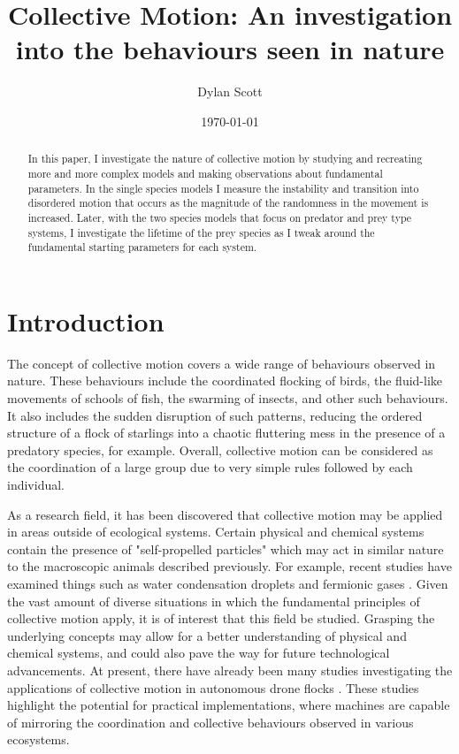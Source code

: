 \documentclass[%
11pt,
amsmath, amssymb,
aps,
pra
]{revtex4-2}
\begin{document}
\title{Collective Motion: An investigation into the behaviours seen in nature}
\author{Dylan Scott}
\date{\today}


\begin{abstract}
In this paper, I investigate the nature of collective motion by studying and recreating more and more complex models
and making observations about fundamental parameters. In the single species models I measure the instability and transition
into disordered motion that occurs as the magnitude of the randomness in the movement is increased. Later, with the two species
models that focus on predator and prey type systems, I investigate the lifetime of the prey species as I tweak around the fundamental
starting parameters for each system. 
\end{abstract}

\maketitle


\tableofcontents
\section{Introduction}
The concept of collective motion covers a wide range of behaviours observed in nature. 
These behaviours include the coordinated flocking of birds, the fluid-like movements of schools of fish, 
the swarming of insects, and other such behaviours. It also includes the sudden disruption of such patterns, reducing
the ordered structure of a flock of starlings into a chaotic fluttering mess in the presence of a predatory species, for example.
Overall, collective motion can be considered as the coordination of a large group due to very simple rules followed
by each individual. 

As a research field, it has been discovered that collective motion may be applied in areas outside of 
ecological systems. Certain physical and chemical systems contain the presence of "self-propelled particles" which may
act in similar nature to the macroscopic animals described previously. For example, recent studies have examined 
things such as water condensation droplets \cite{lin2023emergent} and fermionic gases \cite{wang2023viscous}.
Given the vast amount of diverse situations in which the fundamental principles of collective motion apply, 
it is of interest that this field be studied. Grasping the underlying concepts may allow for a better understanding
of physical and chemical systems, and could also pave the way for future technological advancements. At present, there
have already been many studies investigating the applications of collective motion in autonomous drone flocks
\cite{verdoucq2022bio,zhao2018self,albani2022distributed}. These studies highlight the potential for practical 
implementations, where machines are capable of mirroring the coordination and collective behaviours observed in various
ecosystems.
\end{document}
